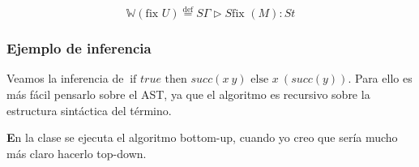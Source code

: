 \documentclass{report}
\theoremstyle{definition} %
\newenvironment{nota}[1]
    {\begin{leftbar}\textbf{#1}}
    {\end{leftbar}}
\newcommand{\eqdef}{\overset{\text{def}}{=}}
\newcommand{\ifte}[3]{\ \text{if } #1 \text{ then } #2 \text{ else } #3}
\newcommand{\app}[2]{#1 \ #2} %
\newcommand{\tipa}[3]{#1 \rhd #2 : #3} %
\newcommand{\suc}[1]{succ(#1)}
\newcommand{\fix}[1]{\text{fix } #1}
\newcommand{\tsust}[1]{S#1} %
\newcommand{\infer}[1]{\mathbb{W}(#1)}
\begin{document}
\[
    \infer{\fix{U}} \eqdef
    \tipa
        {\tsust{\Gamma}}
        {\tsust{\fix{(M)}}}
        {\tsust{t}}
\]

\subsubsection{Ejemplo de inferencia}

Veamos la inferencia de $\ifte{true}{\suc{\app{x}{y}}}{\app{x}{(\suc{y})}}$.
Para ello es más fácil pensarlo sobre el AST, ya que el algoritmo es recursivo
sobre la estructura sintáctica del término.

\begin{figure}[H]
    \centering
\end{figure}

\begin{nota}
    En la clase se ejecuta el algoritmo bottom-up, cuando yo creo que sería
    mucho más claro hacerlo top-down.
\end{nota}
\end{document}
